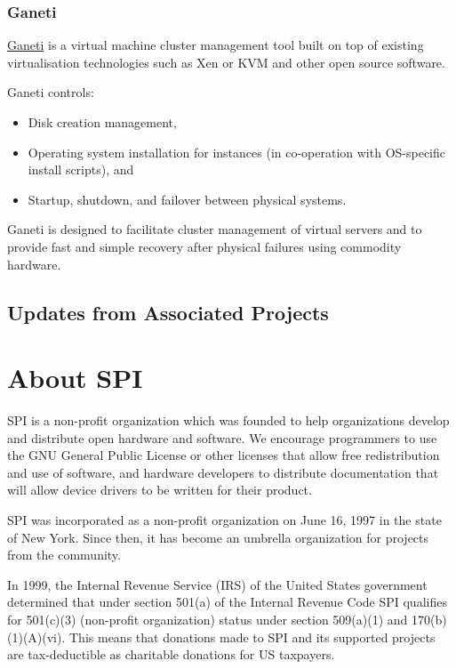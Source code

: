 \documentclass[a4paper]{report}
\begin{document}
\subsection{Ganeti}

\href{https://www.ganeti.org/}{Ganeti} is a virtual machine cluster management tool built on top of existing virtualisation technologies such as Xen or KVM and other open source software.

Ganeti controls:

\begin{itemize}

\item Disk creation management,
\item Operating system installation for instances (in co-operation with OS-specific install scripts), and
\item Startup, shutdown, and failover between physical systems.

\end{itemize}

Ganeti is designed to facilitate cluster management of virtual servers and to provide fast and simple recovery after physical failures using commodity hardware.

\section{Updates from Associated Projects}


\appendix
\chapter{About SPI}

SPI is a non-profit organization which was founded to help organizations develop and distribute open hardware and software. We encourage programmers to use the GNU General Public License or other licenses that allow free redistribution and use of software, and hardware developers to distribute documentation that will allow device drivers to be written for their product.

SPI was incorporated as a non-profit organization on June 16, 1997 in the state of New York. Since then, it has become an umbrella organization for projects from the community.

In 1999, the Internal Revenue Service (IRS) of the United States government determined that under section 501(a) of the Internal Revenue Code SPI qualifies for 501(c)(3) (non-profit organization) status under section 509(a)(1) and 170(b)(1)(A)(vi). This means that donations made to SPI and its supported projects are tax-deductible as charitable donations for US taxpayers.
\end{document}
